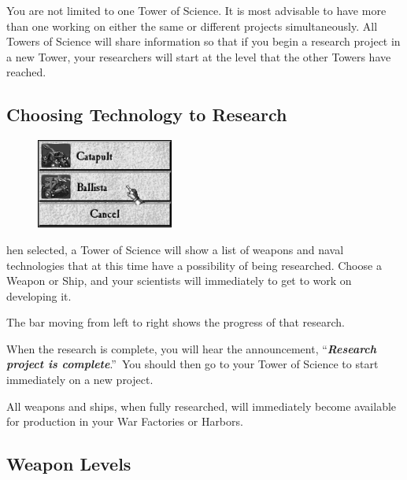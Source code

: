 You are not limited to one Tower of Science. It is most advisable to have more than one working on either the same or different projects simultaneously. All Towers of Science will share information so that if you begin a research project in a new Tower, your researchers will start at the level that the other Towers have reached.

\clearpage

\subsection{Choosing Technology to Research}


\begin{figure}
	\vspace{-20pt}
	\begin{center}
		\includegraphics[width=0.4\textwidth]{Iresearch_begin}
	\end{center}
	\vspace{-20pt}
\end{figure}

hen selected, a Tower of Science will show a list of weapons and naval technologies that at this time have a possibility of being researched. Choose a Weapon or Ship, and your scientists will immediately to get to work on developing it.

The bar moving from left to right shows the progress of that research.

When the research is complete, you will hear the announcement, “\textbf{\textit{Research project is complete}}.” You should then go to your Tower of Science to start immediately on a new project.

All weapons and ships, when fully researched, will immediately become available for production in your War Factories or Harbors.

\subsection{Weapon Levels}

